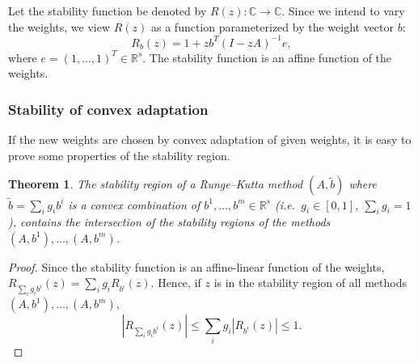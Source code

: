 \documentclass[a4paper]{article}
\numberwithin{equation}{section}
\theoremstyle{plain}
\newtheorem{theorem}{Theorem}
\theoremstyle{definition}
\numberwithin{theorem}{section}
\newcommand{\R}{\mathbb{R}}
\newcommand{\CN}{\mathbb{C}}
\newcommand{\1}{\mathbbm{1}}
\newcommand{\bt}{\tilde{b}}
\begin{document}
Let the stability function be denoted by $R(z): \CN \to \CN$.
Since we intend to vary the weights, we view $R(z)$
as a function parameterized by the weight vector $b$:
\begin{equation}
R_b(z) = 1 + zb^T(I - zA)^{-1}e,
\end{equation}
where $e = (1, \dots, 1)^T \in \R^s$.
The stability function is an affine function of the weights.



\subsubsection{Stability of convex adaptation}

If the new weights are chosen by convex adaptation of given weights,
it is easy to prove some properties of the stability region.
\begin{theorem} \label{thm:stability-region}
  The stability region of a Runge--Kutta method $(A,\bt)$ where
  $\bt = \sum_{i} g_i b^i$ is a convex combination of
  $b^1, \dots, b^m \in \R^s$ (i.e.\ $g_i \in [0,1]$, $\sum_i g_i = 1$),
  contains the intersection of the stability regions of
  the methods $(A,b^1), \dots, (A,b^m)$.
\end{theorem}
\begin{proof}
  Since the stability function is an affine-linear function of the
  weights, $R_{\sum_i g_i b^i}(z) = \sum_i g_i R_{b^i}(z)$. Hence,
  if $z$ is in the stability region of all methods $(A,b^1), \dots, (A,b^m)$,
  \begin{equation}
    | R_{\sum_i g_i b^i}(z) |
    \le
    \sum_i g_i | R_{b^i}(z) |
    \le
    1.
  \end{equation}
\end{proof}
\end{document}
